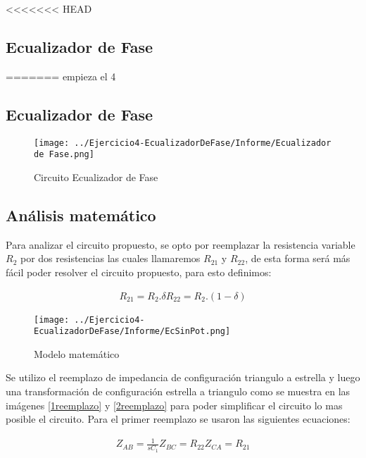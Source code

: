 <<<<<<< HEAD
\subsection{Ecualizador de Fase}
=======
empieza el 4

\subsection{Ecualizador de Fase}


\begin{figure}[H]
	\centering
	\texttt{[image: ../Ejercicio4-EcualizadorDeFase/Informe/Ecualizador de Fase.png]}
	\caption{Circuito Ecualizador de Fase}
\end{figure}


\subsection{Análisis matemático}

Para analizar el circuito propuesto, se opto por reemplazar la resistencia variable $R_2$ por dos resistencias las cuales llamaremos $R_{21}$ y $R_{22}$, de esta forma será más fácil poder resolver el circuito propuesto, para esto definimos:

\begin{align}

	\begin{equation}
		R_{21} = R_2 . \delta
	\end{equation}

	\begin{equation}
		R_{22}= R_2 . (1 - \delta)
	\end{equation}

\end{align}


\begin{figure}[H]
	\centering
	\texttt{[image: ../Ejercicio4-EcualizadorDeFase/Informe/EcSinPot.png]}
	\caption{Modelo matemático}
\end{figure}

Se utilizo el reemplazo de impedancia de configuración triangulo a estrella y luego una transformación de configuración estrella a triangulo como se muestra en las imágenes \ref{1reemplazo} y \ref{2reemplazo}  para poder simplificar el circuito lo mas posible el circuito.
Para el primer reemplazo se usaron las siguientes ecuaciones:

\begin{align}

	\begin{equation}
		Z_{AB}= \frac{1}{sC_1}
	\end{equation}

	\begin{equation}
		Z_{BC}= R_{22}
	\end{equation}
	
	\begin{equation}
		Z_{CA}= R_{21}
	\end{equation}

\end{align}

